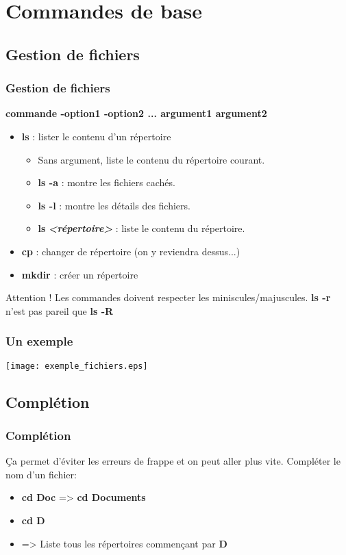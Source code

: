 \documentclass{beamer}
\begin{document}
    \section{Commandes de base}
    \subsection{Gestion de fichiers}
    \begin{frame}
        \frametitle{Gestion de fichiers}
        {\bf commande -option1 -option2 ... argument1 argument2}
        \begin{itemize}
            \item {\bf ls} : lister le contenu d'un répertoire
                \begin{itemize}
                    \item Sans argument, liste le contenu du répertoire courant.
                    \item {\bf ls -a} : montre les fichiers cachés.
                    \item {\bf ls -l} : montre les détails des fichiers.
                    \item {\bf ls }{\bf {\it<répertoire>}} : liste le contenu du répertoire.
                \end{itemize}
            \item {\bf cp} : changer de répertoire (on y reviendra dessus...)
            \item {\bf mkdir} : créer un répertoire
        \end{itemize}
        \begin{block}{Attention !}
            Les commandes doivent respecter les miniscules/majuscules.\newline
            {\bf ls -r} n'est pas pareil que {\bf ls -R}
        \end{block}
    \end{frame}

    \begin{frame}
        \frametitle{Un exemple}
        \texttt{[image: exemple\_fichiers.eps]}
    \end{frame}

    \subsection{Complétion}
    \begin{frame}
        \frametitle{Complétion}
        Ça permet d'éviter les erreurs de frappe et on peut aller plus vite.\newline \newline
        Compléter le nom d'un fichier:
        \begin{itemize}
            \item {\bf cd Doc} \Tab => {\bf cd Documents}
            \item {\bf cd D} \Tab \Tab
            \item => Liste tous les répertoires commençant par {\bf D}
        \end{itemize}
    \end{frame}
\end{document}
